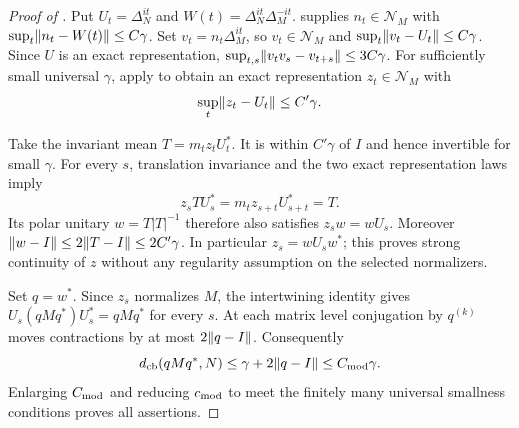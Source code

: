 \begin{proof}[Proof of ]
Put $U_t=\Delta_N^{it}$ and
$W(t)=\Delta_N^{it}\Delta_M^{-it}$.
 supplies $n_t\in\mathcal N_M$
with $\sup_t\lVert n_t-W(t)\rVert\le C\gamma$. Set
$v_t=n_t\Delta_M^{it}$, so $v_t\in\mathcal N_M$ and
$\sup_t\lVert v_t-U_t\rVert\le C\gamma$. Since $U$ is an exact
representation, $\sup_{t,s}\lVert v_tv_s-v_{t+s}\rVert\le3C\gamma$.
For sufficiently small universal $\gamma$, apply
 to obtain an
exact representation $z_t\in\mathcal N_M$ with
\[
 \sup_t\lVert z_t-U_t\rVert\le C'\gamma.
\]

Take the invariant mean
$T=m_tz_tU_t^*$. It is within $C'\gamma$ of $I$ and hence
invertible for small $\gamma$. For every $s$, translation
invariance and the two exact representation laws imply
\[
 z_sTU_s^*=m_tz_{s+t}U_{s+t}^*=T.
\]
Its polar unitary $w=T|T|^{-1}$ therefore also satisfies
$z_sw=wU_s$. Moreover
$\lVert w-I\rVert\le2\lVert T-I\rVert\le2C'\gamma$.
In particular $z_s=wU_sw^*$; this proves strong continuity of $z$
without any regularity assumption on the selected normalizers.

Set $q=w^*$. Since $z_s$ normalizes $M$, the intertwining identity
gives $U_s(qMq^*)U_s^*=qMq^*$ for every $s$.
At each matrix level conjugation by $q^{(k)}$ moves contractions
by at most $2\lVert q-I\rVert$. Consequently
\[
 d_{\mathrm{cb}}(qMq^*,N)\le\gamma+2\lVert q-I\rVert\le C_{\rm mod}\gamma.
\]
Enlarging $C_{\rm mod}$ and reducing $c_{\rm mod}$ to meet the
finitely many universal smallness conditions proves all assertions.
\end{proof}
